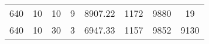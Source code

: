 \begin{table}[H]
\begin{tabular}{l|ccccccc}
 640                                                                  & 10                                                                                                                                                             & 10                                                                                                                               & 9                                                                                                                                                              & 8907.22                                                                                                                          & 1172                         & 9880                         & 19                                                                   \\
 640                                                                  & 10                                                                                                                                                             & 30                                                                                                                               & 3                                                                                                                                                              & 6947.33                                                                                                                          & 1157                         & 9852                         & 9130                                                                 \\
        \hline
    \end{tabular}
\end{table}